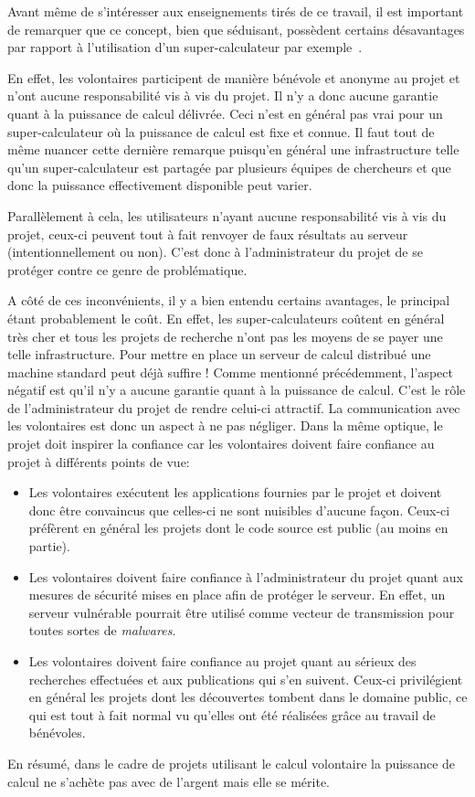 \documentclass[a4paper, 12pt]{report}
\begin{document}
Avant même de s'intéresser aux enseignements tirés de ce travail, il est important de remarquer que ce concept, bien que séduisant, possèdent certains désavantages par rapport à l'utilisation d'un super-calculateur par exemple~\cite{VOLUNTEER}.

En effet, les volontaires participent de manière bénévole et anonyme au projet et n'ont aucune responsabilité vis à vis du projet. Il n'y a donc aucune garantie quant à la puissance de calcul délivrée. Ceci n'est en général pas vrai pour un super-calculateur où la puissance de calcul est fixe et connue. Il faut tout de même nuancer cette dernière remarque puisqu'en général une infrastructure telle qu'un super-calculateur est partagée par plusieurs équipes de chercheurs et que donc la puissance effectivement disponible peut varier.

Parallèlement à cela, les utilisateurs n'ayant aucune responsabilité vis à vis du projet, ceux-ci peuvent tout à fait renvoyer de faux résultats au serveur (intentionnellement ou non). C'est donc à l'administrateur du projet de se protéger contre ce genre de problématique.

A côté de ces inconvénients, il y a bien entendu certains avantages, le principal étant probablement le coût. En effet, les super-calculateurs coûtent en général très cher et tous les projets de recherche n'ont pas les moyens de se payer une telle infrastructure. Pour mettre en place un serveur de calcul distribué une machine standard peut déjà suffire ! Comme mentionné précédemment, l'aspect négatif est qu'il n'y a aucune garantie quant à la puissance de calcul. C'est le rôle de l'administrateur du projet de rendre celui-ci attractif. La communication avec les volontaires est donc un aspect à ne pas négliger. Dans la même optique, le projet doit inspirer la confiance car les volontaires doivent faire confiance au projet à différents points de vue:
\begin{itemize}
\item Les volontaires exécutent les applications fournies par le projet et doivent donc être convaincus que celles-ci ne sont nuisibles d'aucune façon. Ceux-ci préfèrent en général les projets dont le code source est public (au moins en partie).
\item Les volontaires doivent faire confiance à l'administrateur du projet quant aux mesures de sécurité mises en place afin de protéger le serveur. En effet, un serveur vulnérable pourrait être utilisé comme vecteur de transmission pour toutes sortes de \textit{malwares}.
\item Les volontaires doivent faire confiance au projet quant au sérieux des recherches effectuées et aux publications qui s'en suivent. Ceux-ci privilégient en général les projets dont les découvertes tombent dans le domaine public, ce qui est tout à fait normal vu qu'elles ont été réalisées grâce au travail de bénévoles.
\end{itemize}
En résumé, dans le cadre de projets utilisant le calcul volontaire la puissance de calcul ne s'achète pas avec de l'argent mais elle se mérite.
\end{document}
